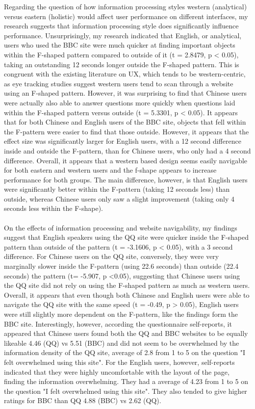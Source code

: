 Regarding the question of how information processing styles western (analytical) versus eastern (holistic) would affect user performance on different interfaces, my research suggests that information processing style does significantly influence performance. Unsurprisingly, my research indicated that English, or analytical, users who used the BBC site were much quicker at finding important objects within the F-shaped pattern compared to outside of it (t = 2.8479, p < 0.05), taking an outstanding 12 seconds longer outside the F-shaped pattern. This is congruent with the existing literature on UX, which tends to be western-centric, as eye tracking studies suggest western users tend to scan through a website using an F-shaped pattern. However, it was surprising to find that Chinese users were actually also able to answer questions more quickly when questions laid within the F-shaped pattern versus outside (t = 5.3301, p < 0.05). It appears that for both Chinese and English users of the BBC site, objects that fell within the F-pattern were easier to find that those outside. However, it appears that the effect size was significantly larger for English users, with a 12 second difference inside and outside the F-pattern, than for Chinese users, who only had a 4 second difference. Overall, it appears that a western based design seems easily navigable for both eastern and western users and the f-shape appears to increase performance for both groups. The main difference, however, is that English users were significantly better within the F-pattern (taking 12 seconds less) than outside, whereas Chinese users only saw a slight improvement (taking only 4 seconds less within the F-shape). 
\\\\
On the effects of information processing and website navigability, my findings suggest that English speakers using the QQ site were quicker inside the F-shaped pattern than outside of the pattern (t = -3.1606, p < 0.05), with a 3 second difference. For Chinese users on the QQ site, conversely, they were very marginally slower inside the F-pattern (using 22.6 seconds) than outside (22.4 seconds) the pattern (t= -5.907, p <0.05), suggesting that Chinese users using the QQ site did not rely on using the F-shaped pattern as much as western users. Overall, it appears that even though both Chinese and English users were able to navigate the QQ site with the same speed (t = -0.49, p > 0.05), English users were still slightly more dependent on the F-pattern, like the findings form the BBC site. Interestingly, however, according the questionnaire self-reports, it appeared that Chinese users found both the QQ and BBC websites to be equally likeable 4.46 (QQ) vs 5.51 (BBC) and did not seem to be overwhelmed by the information density of the QQ site, average of 2.8 from 1 to 5 on the question "I felt overwhelmed using this site". For the English users, however, self-reports indicated that they were highly uncomfortable with the layout of the page, finding the information overwhelming. They had a average of 4.23 from 1 to 5 on the question "I felt overwhelmed using this site". They also tended to give higher ratings for BBC than QQ 4.88 (BBC) vs 2.62 (QQ). 
